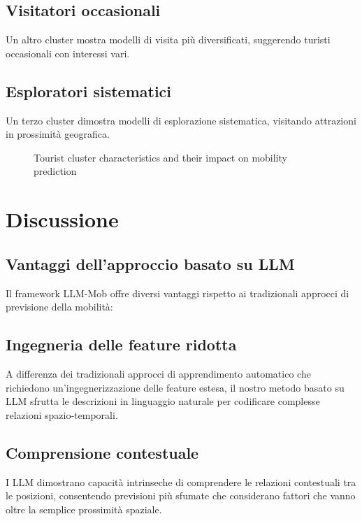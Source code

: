 \documentclass[12pt,a4paper]{article}
\begin{document}
\subsection{Visitatori occasionali}
Un altro cluster mostra modelli di visita più diversificati, suggerendo turisti occasionali con interessi vari.

\subsection{Esploratori sistematici}
Un terzo cluster dimostra modelli di esplorazione sistematica, visitando attrazioni in prossimità geografica.

\begin{figure}[H]
\centering
\caption{Tourist cluster characteristics and their impact on mobility prediction}
\label{fig:cluster_analysis}
\end{figure}


\newpage

\section{Discussione}

\subsection{Vantaggi dell'approccio basato su LLM}

Il framework LLM-Mob offre diversi vantaggi rispetto ai tradizionali approcci di previsione della mobilità:

\subsection{Ingegneria delle feature ridotta}
A differenza dei tradizionali approcci di apprendimento automatico che richiedono un'ingegnerizzazione delle feature estesa, il nostro metodo basato su LLM sfrutta le descrizioni in linguaggio naturale per codificare complesse relazioni spazio-temporali.

\subsection{Comprensione contestuale}
I LLM dimostrano capacità intrinseche di comprendere le relazioni contestuali tra le posizioni, consentendo previsioni più sfumate che considerano fattori che vanno oltre la semplice prossimità spaziale.
\end{document}
